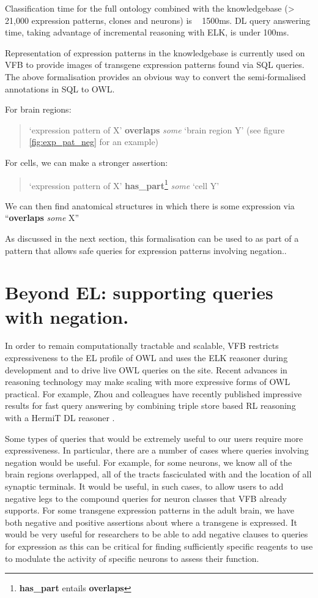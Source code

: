 \documentclass[runningheads,a4paper]{llncs}
\begin{document}
Classification time for the full ontology combined with the
knowledgebase (> 21,000 expression patterns, clones and neurons) is  ~
1500ms.  DL query answering time, taking advantage of incremental
reasoning with ELK, is under 100ms.

Representation of expression patterns in the knowledgebase is
currently used on VFB to provide images of transgene
expression patterns found via SQL queries. The above formalisation
provides an obvious way to convert the semi-formalised annotations in
SQL to OWL.

For brain regions:

\begin{quote}`expression pattern of X' \textbf{overlaps} \textit{some} `brain
region Y'  (see figure \ref{fig:exp_pat_neg} for an example)\end{quote}

For cells, we can make a stronger assertion:

\begin{quote}`expression pattern of X'
\textbf{has\_part}\footnote{\textbf{has\_part} entails \textbf{overlaps}} \textit{some} `cell Y' \end{quote}

We can then find anatomical structures in which there is some
expression via ``\textbf{overlaps} \textit{some} X''

As discussed in the next section, this formalisation can be used to as
part of a pattern that allows safe queries for expression patterns involving negation..

\section{Beyond EL: supporting queries with negation.}

In order to remain computationally tractable and scalable, VFB
restricts expressiveness to the EL profile of OWL and uses the ELK
reasoner \cite{kazakov2012elk} during development and to drive live
OWL queries on the site. Recent advances in reasoning
technology may make scaling with more expressive forms of OWL
practical. For example, Zhou and colleagues have recently published
impressive results for fast query answering by combining triple store
based RL reasoning with a HermiT DL reasoner \cite{ZNCH14a}.

Some types of queries that would be extremely useful to our users
require more expressiveness.  In particular, there are a number of
cases where queries involving negation would be useful.  For example,
for some neurons, we know all of the brain regions overlapped, all of
the tracts fasciculated with and the location of all synaptic
terminals.  It would be useful, in such cases, to allow users to add
negative legs to the compound queries for neuron classes that VFB
already supports.  For some transgene expression
patterns in the adult brain, we have both negative and positive
assertions about where a transgene is expressed.  It would be very
useful for researchers to be able to add negative clauses to queries for
expression as this can be critical for finding sufficiently
specific reagents to use to modulate the activity of specific neurons
to assess their function.
\end{document}
